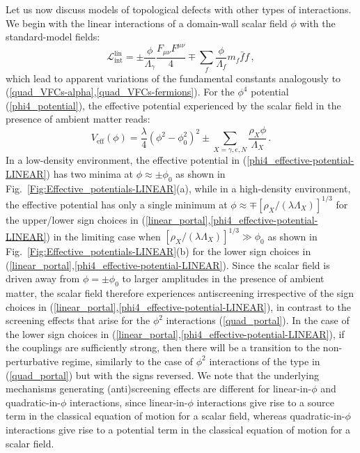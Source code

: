 \documentclass[aps,prd,onecolumn,nofootinbib]{revtex4-2} %
\begin{document}
Let us now discuss models of topological defects with other types of interactions. 
We begin with the linear interactions of a domain-wall scalar field $\phi$ with the standard-model fields: 
\begin{equation}
\label{linear_portal}
\mathcal{L}_\textrm{int}^\textrm{lin} = \pm \frac{\phi}{\Lambda_\gamma} \frac{F_{\mu\nu}F^{\mu\nu}}{4} \mp \sum_f \frac{\phi}{\Lambda_f} m_f \bar{f}f  \, , 
\end{equation}
which lead to apparent variations of the fundamental constants analogously to (\ref{quad_VFCs-alpha},\ref{quad_VFCs-fermions}). 
For the $\phi^4$ potential (\ref{phi4_potential}), the effective potential experienced by the scalar field in the presence of ambient matter reads: 
\begin{equation}
\label{phi4_effective-potential-LINEAR}
V_\textrm{eff} \left( \phi \right) = \frac{\lambda}{4} \left( \phi^2 - \phi_0^2 \right)^2 \pm \sum_{X=\gamma,e,N} \frac{\rho_X \phi}{ \Lambda_X }  \, .   
\end{equation}
In a low-density environment, the effective potential in (\ref{phi4_effective-potential-LINEAR}) has two minima at $\phi \approx \pm \phi_0$ as shown in Fig.~\ref{Fig:Effective_potentials-LINEAR}(a), while in a high-density environment, the effective potential has only a single minimum at $\phi \approx \mp [\rho_X / (\lambda \Lambda_X)]^{1/3}$ for the upper/lower sign choices in (\ref{linear_portal},\ref{phi4_effective-potential-LINEAR}) in the limiting case when $[\rho_X / (\lambda \Lambda_X)]^{1/3} \gg \phi_0$ as shown in Fig.~\ref{Fig:Effective_potentials-LINEAR}(b) for the lower sign choices in (\ref{linear_portal},\ref{phi4_effective-potential-LINEAR}). 
Since the scalar field is driven away from $\phi = \pm \phi_0$ to larger amplitudes in the presence of ambient matter, the scalar field therefore experiences antiscreening irrespective of the sign choices in (\ref{linear_portal},\ref{phi4_effective-potential-LINEAR}), in contrast to the screening effects that arise for the $\phi^2$ interactions (\ref{quad_portal}). 
In the case of the lower sign choices in (\ref{linear_portal},\ref{phi4_effective-potential-LINEAR}), if the couplings are sufficiently strong, then there will be a transition to the non-perturbative regime, similarly to the case of $\phi^2$ interactions of the type in (\ref{quad_portal}) but with the signs reversed. 
We note that the underlying mechanisms generating (anti)screening effects are different for linear-in-$\phi$ and quadratic-in-$\phi$ interactions, since linear-in-$\phi$ interactions give rise to a source term in the classical equation of motion for a scalar field, whereas quadratic-in-$\phi$ interactions give rise to a potential term in the classical equation of motion for a scalar field. 
\end{document}
